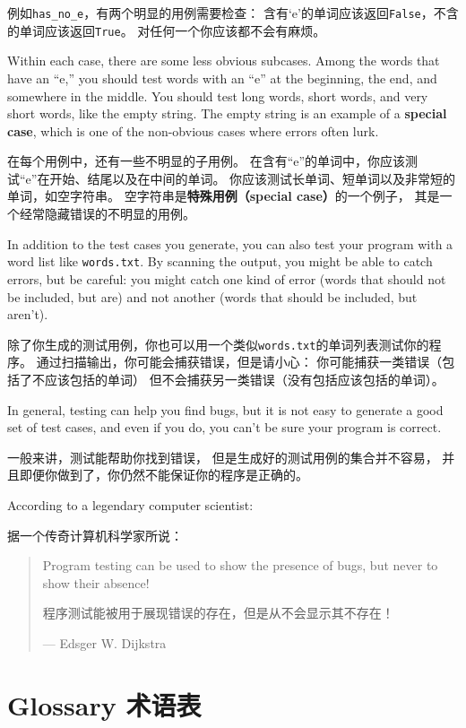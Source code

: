 \documentclass[10pt]{book}
\begin{document}
\begin{CJK}{UTF8}{gbsn}
例如\verb"has_no_e"，有两个明显的用例需要检查：
含有`e'的单词应该返回{\tt False}，不含的单词应该返回{\tt True}。
对任何一个你应该都不会有麻烦。

Within each case, there are some less obvious subcases.  Among the
words that have an ``e,'' you should test words with an ``e'' at the
beginning, the end, and somewhere in the middle.  You should test long
words, short words, and very short words, like the empty string.  The
empty string is an example of a {\bf special case}, which is one of
the non-obvious cases where errors often lurk.

在每个用例中，还有一些不明显的子用例。
在含有``e''的单词中，你应该测试``e''在开始、结尾以及在中间的单词。
你应该测试长单词、短单词以及非常短的单词，如空字符串。
空字符串是{\bf 特殊用例（special case）}的一个例子，
其是一个经常隐藏错误的不明显的用例。

In addition to the test cases you generate, you can also test
your program with a word list like {\tt words.txt}.  By scanning
the output, you might be able to catch errors, but be careful:
you might catch one kind of error (words that should not be
included, but are) and not another (words that should be included,
but aren't).

除了你生成的测试用例，你也可以用一个类似{\tt words.txt}的单词列表测试你的程序。
通过扫描输出，你可能会捕获错误，但是请小心：
你可能捕获一类错误（包括了不应该包括的单词）
但不会捕获另一类错误（没有包括应该包括的单词）。

In general, testing can help you find bugs, but it is not easy to
generate a good set of test cases, and even if you do, you can't
be sure your program is correct.

一般来讲，测试能帮助你找到错误，
但是生成好的测试用例的集合并不容易，
并且即便你做到了，你仍然不能保证你的程序是正确的。

According to a legendary computer scientist:

据一个传奇计算机科学家所说：

\begin{quote}
Program testing can be used to show the presence of bugs, but never to
show their absence!

程序测试能被用于展现错误的存在，但是从不会显示其不存在！

--- Edsger W. Dijkstra
\end{quote}


\section{Glossary 术语表}


\end{CJK}
\end{document}
